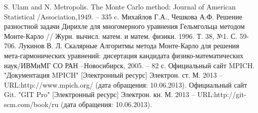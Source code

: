 \newpage
\begin{thebibliography}{99} 
		S. Ulam and N. Metropolis. The Monte Carlo method: Journal of American Statistical /Association,1949. -- 335 c.
	Михайлов Г.А., Чешкова А.Ф. Решение разностной задачи Дирихле для многомерного уравнения Гельмгольца методом Монте-Карло // Журн. вычисл. матем. и матем. физики.  1996.  Т. 38,  №1.  С. 59-706.
	 Лукинов В. Л. Скалярные Алгоритмы метода Монте-Карло для решения мета-гармонических уравнений: дисертация кандидата физико-математических наук/ИВМиМГ СО РАН --Новосибирск, 2005. -- 82 с.
	Официальный сайт MPICH. "Документация MPICH" [Электронный ресурс] Электрон. ст. М. 2013 – URL:http://www.mpich.org/ (дата обращения: 10.06.2013).
	Официальный сайт Git. "GIT Pro" [Электронный ресурс] Электрон. кн. М. 2013 – URL:http://git-scm.com/book/ru (дата обращения: 10.06.2013).

\end{thebibliography}
